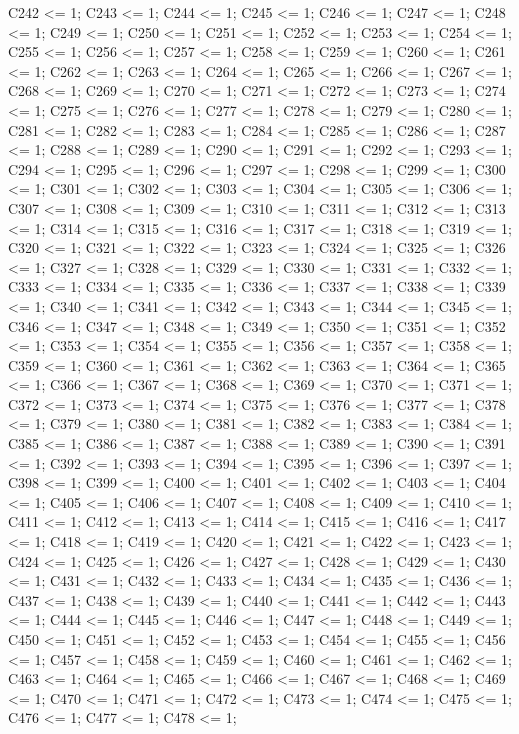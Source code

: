C242 <= 1;
C243 <= 1;
C244 <= 1;
C245 <= 1;
C246 <= 1;
C247 <= 1;
C248 <= 1;
C249 <= 1;
C250 <= 1;
C251 <= 1;
C252 <= 1;
C253 <= 1;
C254 <= 1;
C255 <= 1;
C256 <= 1;
C257 <= 1;
C258 <= 1;
C259 <= 1;
C260 <= 1;
C261 <= 1;
C262 <= 1;
C263 <= 1;
C264 <= 1;
C265 <= 1;
C266 <= 1;
C267 <= 1;
C268 <= 1;
C269 <= 1;
C270 <= 1;
C271 <= 1;
C272 <= 1;
C273 <= 1;
C274 <= 1;
C275 <= 1;
C276 <= 1;
C277 <= 1;
C278 <= 1;
C279 <= 1;
C280 <= 1;
C281 <= 1;
C282 <= 1;
C283 <= 1;
C284 <= 1;
C285 <= 1;
C286 <= 1;
C287 <= 1;
C288 <= 1;
C289 <= 1;
C290 <= 1;
C291 <= 1;
C292 <= 1;
C293 <= 1;
C294 <= 1;
C295 <= 1;
C296 <= 1;
C297 <= 1;
C298 <= 1;
C299 <= 1;
C300 <= 1;
C301 <= 1;
C302 <= 1;
C303 <= 1;
C304 <= 1;
C305 <= 1;
C306 <= 1;
C307 <= 1;
C308 <= 1;
C309 <= 1;
C310 <= 1;
C311 <= 1;
C312 <= 1;
C313 <= 1;
C314 <= 1;
C315 <= 1;
C316 <= 1;
C317 <= 1;
C318 <= 1;
C319 <= 1;
C320 <= 1;
C321 <= 1;
C322 <= 1;
C323 <= 1;
C324 <= 1;
C325 <= 1;
C326 <= 1;
C327 <= 1;
C328 <= 1;
C329 <= 1;
C330 <= 1;
C331 <= 1;
C332 <= 1;
C333 <= 1;
C334 <= 1;
C335 <= 1;
C336 <= 1;
C337 <= 1;
C338 <= 1;
C339 <= 1;
C340 <= 1;
C341 <= 1;
C342 <= 1;
C343 <= 1;
C344 <= 1;
C345 <= 1;
C346 <= 1;
C347 <= 1;
C348 <= 1;
C349 <= 1;
C350 <= 1;
C351 <= 1;
C352 <= 1;
C353 <= 1;
C354 <= 1;
C355 <= 1;
C356 <= 1;
C357 <= 1;
C358 <= 1;
C359 <= 1;
C360 <= 1;
C361 <= 1;
C362 <= 1;
C363 <= 1;
C364 <= 1;
C365 <= 1;
C366 <= 1;
C367 <= 1;
C368 <= 1;
C369 <= 1;
C370 <= 1;
C371 <= 1;
C372 <= 1;
C373 <= 1;
C374 <= 1;
C375 <= 1;
C376 <= 1;
C377 <= 1;
C378 <= 1;
C379 <= 1;
C380 <= 1;
C381 <= 1;
C382 <= 1;
C383 <= 1;
C384 <= 1;
C385 <= 1;
C386 <= 1;
C387 <= 1;
C388 <= 1;
C389 <= 1;
C390 <= 1;
C391 <= 1;
C392 <= 1;
C393 <= 1;
C394 <= 1;
C395 <= 1;
C396 <= 1;
C397 <= 1;
C398 <= 1;
C399 <= 1;
C400 <= 1;
C401 <= 1;
C402 <= 1;
C403 <= 1;
C404 <= 1;
C405 <= 1;
C406 <= 1;
C407 <= 1;
C408 <= 1;
C409 <= 1;
C410 <= 1;
C411 <= 1;
C412 <= 1;
C413 <= 1;
C414 <= 1;
C415 <= 1;
C416 <= 1;
C417 <= 1;
C418 <= 1;
C419 <= 1;
C420 <= 1;
C421 <= 1;
C422 <= 1;
C423 <= 1;
C424 <= 1;
C425 <= 1;
C426 <= 1;
C427 <= 1;
C428 <= 1;
C429 <= 1;
C430 <= 1;
C431 <= 1;
C432 <= 1;
C433 <= 1;
C434 <= 1;
C435 <= 1;
C436 <= 1;
C437 <= 1;
C438 <= 1;
C439 <= 1;
C440 <= 1;
C441 <= 1;
C442 <= 1;
C443 <= 1;
C444 <= 1;
C445 <= 1;
C446 <= 1;
C447 <= 1;
C448 <= 1;
C449 <= 1;
C450 <= 1;
C451 <= 1;
C452 <= 1;
C453 <= 1;
C454 <= 1;
C455 <= 1;
C456 <= 1;
C457 <= 1;
C458 <= 1;
C459 <= 1;
C460 <= 1;
C461 <= 1;
C462 <= 1;
C463 <= 1;
C464 <= 1;
C465 <= 1;
C466 <= 1;
C467 <= 1;
C468 <= 1;
C469 <= 1;
C470 <= 1;
C471 <= 1;
C472 <= 1;
C473 <= 1;
C474 <= 1;
C475 <= 1;
C476 <= 1;
C477 <= 1;
C478 <= 1;
